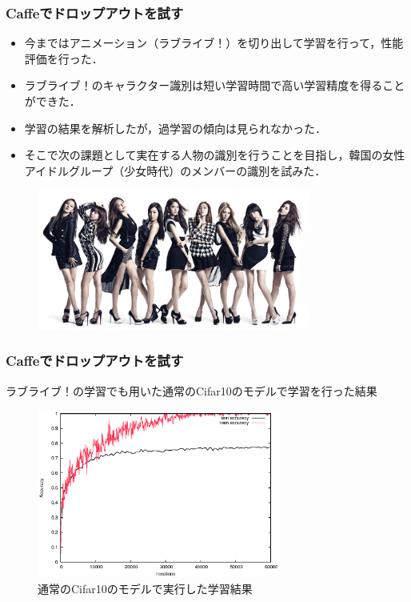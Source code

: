 \documentclass[dvipdfmx,11pt,notheorems]{beamer}
\theoremstyle{definition}
\begin{document}
\begin{frame}\frametitle{Caffeでドロップアウトを試す}
\begin{itemize}
  \item 今まではアニメーション（ラブライブ！）を切り出して学習を行って，性能評価を行った．
  \item ラブライブ！のキャラクター識別は短い学習時間で高い学習精度を得ることができた．
  \item 学習の結果を解析したが，過学習の傾向は見られなかった．
  \item そこで次の課題として実在する人物の識別を行うことを目指し，韓国の女性アイドルグループ（少女時代）のメンバーの識別を試みた．
\end{itemize}
\begin{figure}[htbp]
  \begin{center}
    \includegraphics[clip,width=9cm,bb=0 0 1654 849]{./fig/jpg/snsd.jpg}
  \end{center}
\end{figure}

\end{frame}

\begin{frame}[fragile]\frametitle{Caffeでドロップアウトを試す}
ラブライブ！の学習でも用いた通常のCifar10のモデルで学習を行った結果
\begin{figure}[tb]
  \begin{center}
    \includegraphics[clip,width=8cm]{./fig/eps/overtraining.eps}
  \end{center}
  \caption{通常のCifar10のモデルで実行した学習結果}
\end{figure}
\end{frame}
\end{document}
